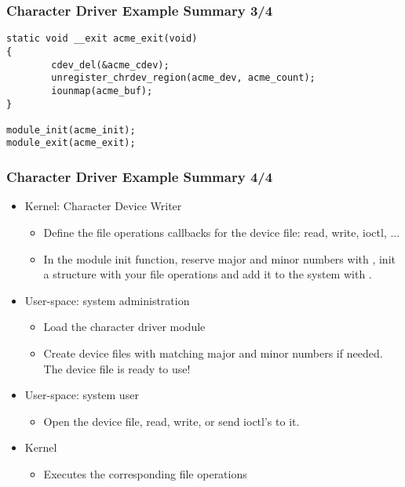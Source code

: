 \begin{frame}[fragile]
  \frametitle{Character Driver Example Summary 3/4}
\begin{verbatim}
static void __exit acme_exit(void)
{
        cdev_del(&acme_cdev);
        unregister_chrdev_region(acme_dev, acme_count);
        iounmap(acme_buf);
}

module_init(acme_init);
module_exit(acme_exit);    
\end{verbatim}
\end{frame}

\begin{frame}
\frametitle{Character Driver Example Summary 4/4}
  \begin{itemize}
  \item Kernel: Character Device Writer
    \begin{itemize}
    \item Define the file operations callbacks for the device file:
      read, write, ioctl, ...
    \item In the module init function, reserve major and minor numbers
      with , init a 
      structure with your file operations and add it to the system
      with .
    \end{itemize}
  \item User-space: system administration
    \begin{itemize}
    \item Load the character driver module
    \item Create device files with matching major and minor numbers if
      needed. The device file is ready to use!
    \end{itemize}
  \item User-space: system user
    \begin{itemize}
    \item Open the device file, read, write, or send ioctl's to it.
    \end{itemize}
  \item Kernel
    \begin{itemize}
    \item Executes the corresponding file operations
    \end{itemize}
  \end{itemize}
\end{frame}
